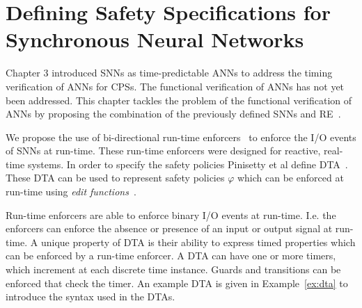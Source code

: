 \section{Defining Safety Specifications for Synchronous Neural Networks}
\label{sec:definitions}

Chapter 3 introduced \acp{SNN} as time-predictable \acp{ANN} to address the timing verification of \acp{ANN} for \acp{CPS}.
The functional verification of \acp{ANN} has not yet been addressed.
This chapter tackles the problem of the functional verification of \acp{ANN} by proposing the combination of the previously defined \acp{SNN} and \acf{RE}~\cite{recps}.

We propose the use of bi-directional run-time enforcers~\cite{recps} to enforce the I/O events of \acp{SNN} at run-time.
These run-time enforcers were designed for reactive, real-time systems.
In order to specify the safety policies Pinisetty et al define \acf{DTA}~\cite{recps}.
These \ac{DTA} can be used to represent safety policies $\varphi$ which can be enforced at run-time using \textit{edit functions}~\cite{recps}.

Run-time enforcers are able to enforce binary I/O events at run-time.
I.e. the enforcers can enforce the absence or presence of an input or output signal at run-time.
A unique property of \ac{DTA} is their ability to express timed properties which can be enforced by a run-time enforcer.
A \ac{DTA} can have one or more timers, which increment at each discrete time instance.
Guards and transitions can be enforced that check the timer.
An example \ac{DTA} is given in Example~\ref{ex:dta} to introduce the syntax used in the \acp{DTA}.

